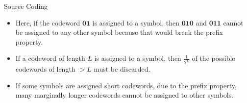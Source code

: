 \begin{vbframe} {Source Coding}
  \begin{itemize}
    \item Here, if the codeword $\mathbf{01}$ is assigned to a symbol, then  $\mathbf{010}$ and  $\mathbf{011}$ cannot be assigned to any other symbol because that would break the prefix property.
    \item If a codeword of length $L$ is assigned to a symbol, then $\frac{1}{2^L}$ of the possible codewords of length $> L$ must be discarded.
    \item If some symbols are assigned short codewords, due to the prefix property,  many marginally longer codewords cannot be assigned to other symbols.
  \end{itemize} 
  
\framebreak
  
  

\end{vbframe}
